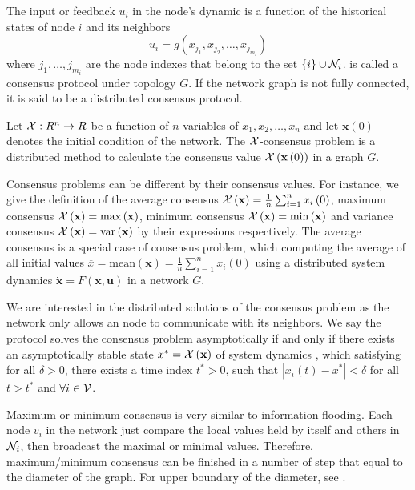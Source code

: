 The input or feedback $u_{i}$ in the node's dynamic is a function
of the historical states of node $i$ and its neighbors
\begin{equation}
u_{i}=g\left(x_{j_{1}},x_{j_{2}},\ldots,x_{j_{m_{i}}}\right)\label{eq:consensus protocol}
\end{equation}
where $j_{1},\ldots,j_{m_{i}}$ are the node indexes that belong to
the set $\left\{ i\right\} \cup{\cal N}_{i}$. 
is called a consensus protocol under topology $G$. If the network
graph is not fully connected, it is said to be a distributed consensus
protocol. 
\begin{defn}
Let ${\cal X}:R^{n}\to R$ be a function of $n$ variables of $x_{1},x_{2},\ldots,x_{n}$
and let $\mathbf{x}\left(0\right)$ denotes the initial condition
of the network. The ${\cal X}$-consensus problem is a distributed
method to calculate the consensus value ${\cal X}\left(\mathbf{x}\left(0\right)\right)$
in a graph $G$. 
\end{defn}
Consensus problems can be different by their consensus values. For
instance, we give the definition of the average consensus ${\cal X}\left(\mathbf{x}\right)=\frac{1}{n}\sum_{i=1}^{n}x_{i}\left(0\right)$,
maximum consensus ${\cal X}\left(\mathbf{x}\right)=\max\left(\mathbf{x}\right)$,
minimum consensus ${\cal X}\left(\mathbf{x}\right)=\min\left(\mathbf{x}\right)$
and variance consensus ${\cal X}\left(\mathbf{x}\right)=\mbox{var}\left(\mathbf{x}\right)$
by their expressions respectively. The average consensus is a special
case of consensus problem, which computing the average of all initial
values $\overline{x}=\mbox{mean}\left(\mathbf{x}\right)=\frac{1}{n}\sum_{i=1}^{n}x_{i}\left(0\right)$
using a distributed system dynamics $\mathbf{\dot{x}}=F\left(\mathbf{x},\mathbf{u}\right)$
in a network $G$. 

We are interested in the distributed solutions of the consensus problem
as the network only allows an node to communicate with its neighbors.
We say the protocol  solves the
consensus problem asymptotically if and only if there exists an asymptotically
stable state $x^{*}={\cal X}\left(\mathbf{x}\right)$ of system dynamics
, which satisfying for all $\delta>0$,
there exists a time index $t^{*}>0$, such that $\left|x_{i}(t)-x^{*}\right|<\delta$
for all $t>t^{*}$ and $\forall i\in{\cal V}$.

Maximum or minimum consensus is very similar to information flooding.
Each node $v_{i}$ in the network just compare the local values held
by itself and others in ${\cal N}_{i}$, then broadcast the maximal
or minimal values. Therefore, maximum/minimum consensus can be finished
in a number of step that equal to the diameter of the graph. For upper
boundary of the diameter, see \cite{Russell1994}.

